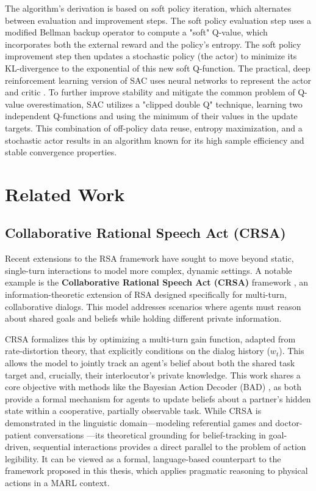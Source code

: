 \documentclass[12pt, a4paper]{report}
\begin{document}
The algorithm's derivation is based on soft policy iteration, which alternates between evaluation and improvement steps. The soft policy evaluation step uses a modified Bellman backup operator to compute a "soft" Q-value, which incorporates both the external reward and the policy's entropy. The soft policy improvement step then updates a stochastic policy (the actor) to minimize its KL-divergence to the exponential of this new soft Q-function. The practical, deep reinforcement learning version of SAC uses neural networks to represent the actor and critic \cite{Haarnoja2018}. To further improve stability and mitigate the common problem of Q-value overestimation, SAC utilizes a "clipped double Q" technique, learning two independent Q-functions and using the minimum of their values in the update targets. This combination of off-policy data reuse, entropy maximization, and a stochastic actor results in an algorithm known for its high sample efficiency and stable convergence properties.

\section{Related Work}

\subsection{Collaborative Rational Speech Act (CRSA)}
Recent extensions to the RSA framework have sought to move beyond static, single-turn interactions to model more complex, dynamic settings. A notable example is the \textbf{Collaborative Rational Speech Act (CRSA)} framework \cite{Estienne2025}, an information-theoretic extension of RSA designed specifically for multi-turn, collaborative dialogs. This model addresses scenarios where agents must reason about shared goals and beliefs while holding different private information.

CRSA formalizes this by optimizing a multi-turn gain function, adapted from rate-distortion theory, that explicitly conditions on the dialog history ($w_t$). This allows the model to jointly track an agent's belief about both the shared task target and, crucially, their interlocutor's private knowledge. This work shares a core objective with methods like the Bayesian Action Decoder (BAD) \cite{BayesAD}, as both provide a formal mechanism for agents to update beliefs about a partner's hidden state within a cooperative, partially observable task. While CRSA \cite{Estienne2025} is demonstrated in the linguistic domain---modeling referential games and doctor-patient conversations ---its theoretical grounding for belief-tracking in goal-driven, sequential interactions provides a direct parallel to the problem of action legibility. It can be viewed as a formal, language-based counterpart to the framework proposed in this thesis, which applies pragmatic reasoning to physical actions in a MARL context.
\end{document}
